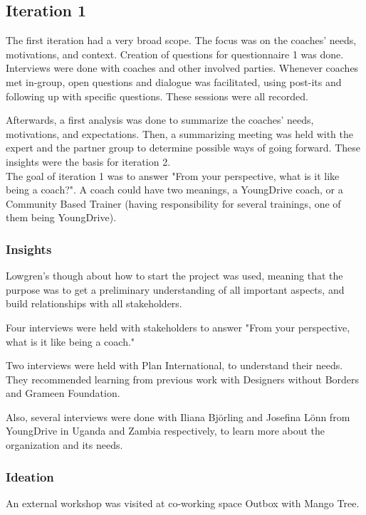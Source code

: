 \subsection{Iteration 1}


The first iteration had a very broad scope. The focus was on the coaches' needs, motivations, and context.  Creation of questions for questionnaire 1 was done. Interviews were done with coaches and other involved parties. Whenever coaches met in-group, open questions and dialogue was facilitated, using post-its and following up with specific questions. These sessions were all recorded.

Afterwards, a first analysis was done to summarize the coaches' needs, motivations, and expectations. Then, a summarizing meeting was held with the expert and the partner group to determine possible ways of going forward. These insights were the basis for iteration 2.\\


The goal of iteration 1 was to answer "From your perspective, what is it like being a coach?". A coach could have two meanings, a YoungDrive coach, or a Community Based Trainer (having responsibility for several trainings, one of them being YoungDrive).

\subsubsection{Insights}

Lowgren's though about how to start the project was used, meaning that the purpose was to get a preliminary understanding of all important aspects, and build relationships with all stakeholders.

Four interviews were held with stakeholders to answer "From your perspective, what is it like being a coach."

Two interviews were held with Plan International, to understand their needs. They recommended learning from previous work with Designers without Borders and Grameen Foundation.

Also, several interviews were done with Iliana Björling and Josefina Lönn from YoungDrive in Uganda and Zambia respectively, to learn more about the organization and its needs.

\subsubsection{Ideation}
An external workshop was visited at co-working space Outbox with Mango Tree.


